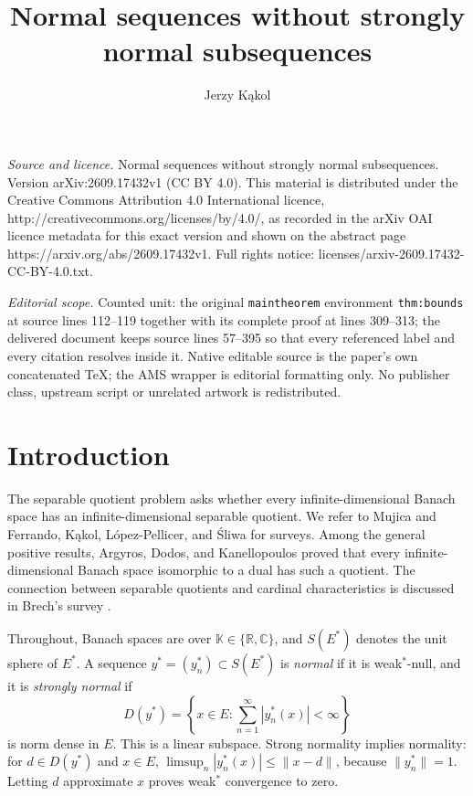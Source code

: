 \documentclass[10pt,a4paper]{amsart}
\newcommand{\K}{\mathbb K}
\begin{document}
\title[Normal sequences without strongly normal subsequences]{Normal sequences without strongly normal subsequences}
\author{Jerzy Kąkol}
\date{}
\maketitle
\noindent\emph{Source and licence.} Normal sequences without strongly normal subsequences. Version arXiv:2609.17432v1 (CC BY 4.0). This material is distributed under the Creative Commons Attribution 4.0 International licence, http://creativecommons.org/licenses/by/4.0/, as recorded in the arXiv OAI licence metadata for this exact version and shown on the abstract page https://arxiv.org/abs/2609.17432v1. Full rights notice: licenses/arxiv-2609.17432-CC-BY-4.0.txt.\par\smallskip
\noindent\textit{Editorial scope.} Counted unit: the original \texttt{maintheorem} environment \texttt{thm:bounds} at source lines 112--119 together with its complete proof at lines 309--313; the delivered document keeps source lines 57--395 so that every referenced label and every citation resolves inside it. Native editable source is the paper's own concatenated TeX; the AMS wrapper is editorial formatting only. No publisher class, upstream script or unrelated artwork is redistributed.
\section{Introduction}

The separable quotient problem asks whether every infinite-dimensional
Banach space has an infinite-dimensional separable quotient. We refer
to Mujica \cite{Mujica} and Ferrando, K\k{a}kol, L\'opez-Pellicer, and
\'Sliwa \cite{FKLS} for surveys. Among the general positive results,
Argyros, Dodos, and Kanellopoulos \cite[Theorem~15]{ADK} proved that every
infinite-dimensional Banach space isomorphic to a dual has such a quotient.
The connection between separable quotients and cardinal characteristics
is discussed in Brech's survey \cite{Brech}.

Throughout, Banach spaces are over $\K\in\{\mathbb R,\mathbb C\}$, and
$S(E^*)$ denotes the unit sphere of $E^*$. A sequence
$y^*=(y_n^*)\subset S(E^*)$ is \emph{normal} if it is weak$^*$-null,
and it is \emph{strongly normal} if
\[
 D(y^*)=\left\{x\in E:\sum_{n=1}^{\infty}|y_n^*(x)|<\infty\right\}
\]
is norm dense in $E$. This is a linear subspace. Strong normality implies
normality: for $d\in D(y^*)$ and $x\in E$,
$\limsup_n|y_n^*(x)|\leqslant\|x-d\|$, because $\|y_n^*\|=1$.
Letting $d$ approximate $x$ proves weak$^*$ convergence to zero.
\end{document}

